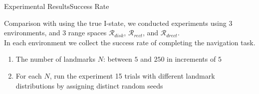 \begin{frame}{Experimental Results}{Success Rate}
     \small{Comparison with using the true I-state, we conducted experiments using 3
     environments, and 3 range spaces $\mathcal{R}_{disk}$, $\mathcal{R}_{rect}$,
     and  $\mathcal{R}_{drect}$. \\
     In each environment we collect the success rate of completing the navigation
     task. 
     \begin{enumerate}
     \item The number of landmarks $N$: between $5$ and $250$ in increments of $5$
     \item For each $N$, run the experiment 15 trials with different landmark
       distributions by assigning distinct random seeds
     \end{enumerate}
    }
\end{frame}
